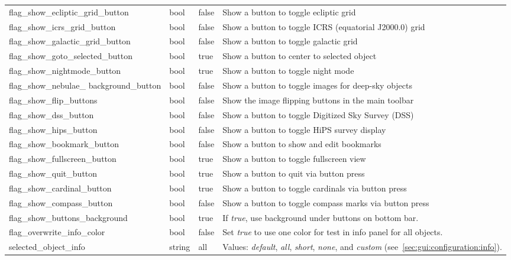 \begin{longtable}{p{50mm}|l|l|p{55mm}}
flag\_show\_ecliptic\_grid\_button     & bool  & false & Show a button to toggle ecliptic grid\\
flag\_show\_icrs\_grid\_button         & bool  & false & Show a button to toggle ICRS (equatorial J2000.0) grid\\
flag\_show\_galactic\_grid\_button     & bool  & false & Show a button to toggle galactic grid\\
flag\_show\_goto\_selected\_button     & bool  & true  & Show a button to center to selected object\\
flag\_show\_nightmode\_button          & bool  & true  & Show a button to toggle night mode\\
flag\_show\_nebulae\_ \mbox{background\_button} & bool & false & Show a button to toggle images for deep-sky objects\\%
flag\_show\_flip\_buttons              & bool  & false & Show the image flipping buttons in the main toolbar \\%
flag\_show\_dss\_button                & bool  & false & Show a button to toggle Digitized Sky Survey (DSS)\\%
flag\_show\_hips\_button               & bool  & false & Show a button to toggle HiPS survey display\\%
flag\_show\_bookmark\_button           & bool  & false & Show a button to show and edit bookmarks\\
flag\_show\_fullscreen\_button         & bool  & true  & Show a button to toggle fullscreen view\\
flag\_show\_quit\_button               & bool  & true  & Show a button to quit via button press\\
flag\_show\_cardinal\_button           & bool  & true  & Show a button to toggle cardinals via button press\\
flag\_show\_compass\_button            & bool  & false & Show a button to toggle compass marks via button press\\
flag\_show\_buttons\_background        & bool  & true  & If \emph{true}, use background under buttons on bottom bar.\\\midrule
flag\_overwrite\_info\_color           & bool  & false & Set \emph{true} to use one color for test in info panel for all objects.\\\midrule
%
selected\_object\_info            & string & all  & Values: \emph{default}, \emph{all}, \emph{short}, \emph{none}, 
                                                    and \emph{custom} (see~\ref{sec:gui:configuration:info}).\\\midrule

\end{longtable}
